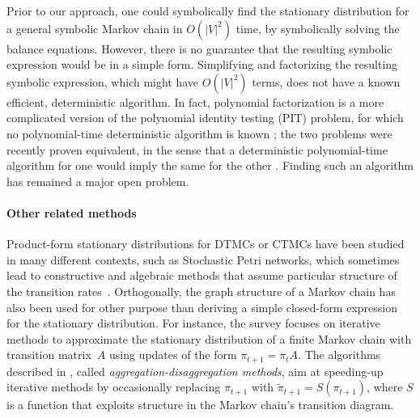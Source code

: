 Prior to our approach, one could symbolically find the stationary distribution for a general symbolic Markov chain in $O(|V|^2)$ time, by symbolically solving the balance equations. However, there is no guarantee that the resulting symbolic expression would be in a simple form.
Simplifying and factorizing the resulting symbolic expression, which might have $O(|V|^2)$ terms,
does not have a known efficient, deterministic algorithm.
In fact, polynomial factorization is a more complicated version of the polynomial identity testing (PIT) problem,
for which no polynomial-time deterministic algorithm is known \cite{A09};
the two problems were recently proven equivalent, in the sense that a deterministic polynomial-time algorithm for one would imply the same for the other \cite{K15}.
Finding such an algorithm has remained a major open problem.



\paragraph*{Other related methods}

Product-form stationary distributions
for DTMCs or CTMCs
have been studied in many different contexts,
such as Stochastic Petri networks,
which sometimes lead to constructive and algebraic methods
that assume particular structure of the transition rates~\cite{D92,B12}.
Orthogonally, the graph structure of a Markov chain
has also been used for other purpose
than deriving a simple closed-form expression
for the stationary distribution.
For instance, the survey \cite{H87} focuses on iterative methods
to approximate the stationary distribution of a finite
Markov chain with transition matrix~$A$
using updates of the form $\pi_{t+1} = \pi_t A$.
The algorithms described in \cite{H87},
called \textit{aggregation-disaggregation methods},
aim at speeding-up iterative methods
by occasionally replacing $\pi_{t+1}$ with $\tilde\pi_{t+1} = S(\pi_{t+1})$,
where $S$ is a function that exploits
structure in the Markov chain's transition diagram.